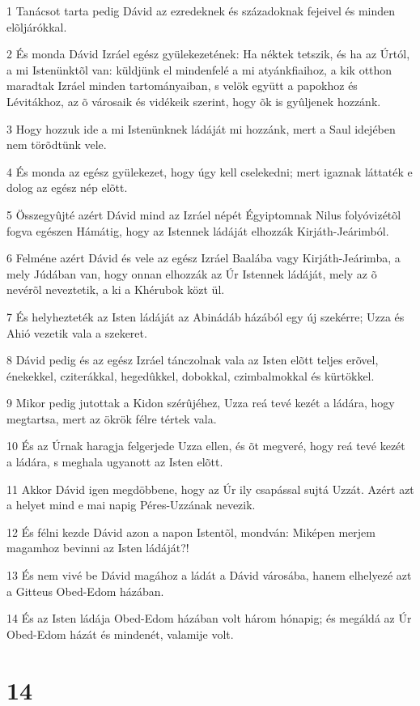 \par 1 Tanácsot tarta pedig Dávid az ezredeknek és századoknak fejeivel és minden elõljárókkal.
\par 2 És monda Dávid Izráel egész gyülekezetének: Ha néktek tetszik, és ha az Úrtól, a mi Istenünktõl van: küldjünk el mindenfelé a mi atyánkfiaihoz, a kik otthon maradtak Izráel minden tartományaiban, s velök együtt a papokhoz és Lévitákhoz, az õ városaik és vidékeik szerint, hogy õk is gyûljenek hozzánk.
\par 3 Hogy hozzuk ide a mi Istenünknek ládáját mi hozzánk, mert a Saul idejében nem törõdtünk vele.
\par 4 És monda az egész gyülekezet, hogy úgy kell cselekedni; mert igaznak láttaték e dolog az egész nép elõtt.
\par 5 Összegyûjté azért Dávid mind az Izráel népét Égyiptomnak Nilus folyóvizétõl fogva egészen Hámátig, hogy az Istennek ládáját elhozzák Kirjáth-Jeárimból.
\par 6 Felméne azért Dávid és vele az egész Izráel Baalába vagy Kirjáth-Jeárimba, a mely Júdában van, hogy onnan elhozzák az Úr Istennek ládáját, mely az õ nevérõl neveztetik, a ki a  Khérubok közt ül.
\par 7 És helyhezteték az Isten ládáját az Abinádáb házából egy új szekérre; Uzza és Ahió vezetik vala a szekeret.
\par 8 Dávid pedig és az egész Izráel tánczolnak vala az Isten elõtt teljes erõvel, énekekkel, cziterákkal, hegedûkkel, dobokkal, czimbalmokkal és kürtökkel.
\par 9 Mikor pedig jutottak a Kidon szérûjéhez, Uzza reá tevé kezét a ládára, hogy megtartsa, mert az ökrök félre tértek vala.
\par 10 És az Úrnak haragja felgerjede Uzza ellen, és õt megveré, hogy reá tevé kezét a ládára, s meghala ugyanott az Isten elõtt.
\par 11 Akkor Dávid igen megdöbbene, hogy az Úr ily csapással sujtá Uzzát. Azért azt a helyet mind e mai napig Péres-Uzzának nevezik.
\par 12 És félni kezde Dávid azon a napon Istentõl, mondván: Miképen merjem magamhoz bevinni az Isten ládáját?!
\par 13 És nem vivé be Dávid magához a ládát a Dávid városába, hanem elhelyezé azt a Gitteus Obed-Edom házában.
\par 14 És az Isten ládája Obed-Edom házában volt három hónapig; és megáldá az Úr Obed-Edom házát és mindenét, valamije volt.

\chapter{14}

